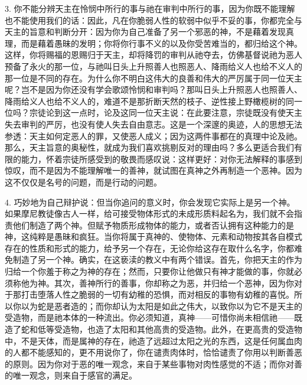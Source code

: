 3. 你不能分辨天主在怜悯中所行的事与祂在审判中所行的事，因为你既不能理解也不能使用我们的话：因此，凡在你脆弱人性的软弱中似乎不妥的事，你都完全与天主的旨意和判断分开：因为你为自己准备了另一个邪恶的神，不是藉着发现真理，而是藉着愚昧的发明；你将你行事不义的以及你受苦难当的，都归给这个神。这样，你将赐福的恩赐归于天主，却将降罚的审判从祂夺去，仿佛基督说祂为恶人预备了永火的那一位，与祂叫日头上升照善人也照恶人、降雨给义人也给不义人的那一位是不同的存在。为什么你不明白这伟大的良善和伟大的严厉属于同一位天主呢？岂不是因为你还没有学会歌颂怜悯和审判吗？那叫日头上升照恶人也照善人、降雨给义人也给不义人的，难道不是那折断天然的枝子、逆性接上野橄榄树的同一位吗？宗徒论到这一点时，论及这同一位天主说：在此要注意，宗徒既没有使天主失去审判的严厉，也没有使人失去自由意志。这是一个深邃的奥迹，人的思想无法参透：天主如何定恶人的罪，又使恶人成义；因为这两件事都在的真理中论及祂。那么，天主旨意的奥秘性，就成为我们喜欢挑剔反对的理由吗？多么更适合我们有限的能力，怀着宗徒所感受到的敬畏而感叹说：这样更好：对你无法解释的事感到惊叹，而不是因为不能理解唯一的善神，就试图在真神之外再制造一个恶神。因为这不仅仅是名号的问题，而是行动的问题。\par

4. 巧妙地为自己辩护说：但当你追问的意义时，你会发现它实际上是另一个神。如果摩尼教徒像古人一样，给可接受物体形式的未成形质料起名为，我们就不会指责他们制造了两个神。但赋予物质形成物体的能力，或者否认拥有这种能力的是神，这纯粹是愚昧和疯狂。当你将属于真神的、使物体、元素和动物按其各自模式存在的性质和形式的能力，给予另一个存在，无论你给这存在取什么名字，你都难免制造了另一个神。确实，在这亵渎的教义中有两个错误。首先，你把天主的作为归给一个你羞于称之为神的存在；然而，只要你让他做只有神才能做的事，你就必须称他为神。其次，善神所行的善事，你却称之为恶，并归给一个恶神，因为你对于那打击堕落人性之脆弱的一切有幼稚的恐惧，而对相反的事物有幼稚的喜悦。所以你以为蛇是恶者造的；而你却认为太阳是如此之伟大，以致你以为它不是天主的受造物，而是祂本体的一种流出。你必须知道，真神——可惜你尚未相信祂——既造了蛇和低等受造物，也造了太阳和其他高贵的受造物。此外，在更高贵的受造物中，不是天体，而是属神的存在，祂造了远超过太阳之光的东西，这是任何属血肉的人都不能感知的，更不用说你了，你在谴责肉体时，恰恰谴责了你用以判断善恶的原则。因为你对于恶的唯一观念，来自于某些事物对肉性感觉的不适；而你对善的唯一观念，则来自于感官的满足。\par

